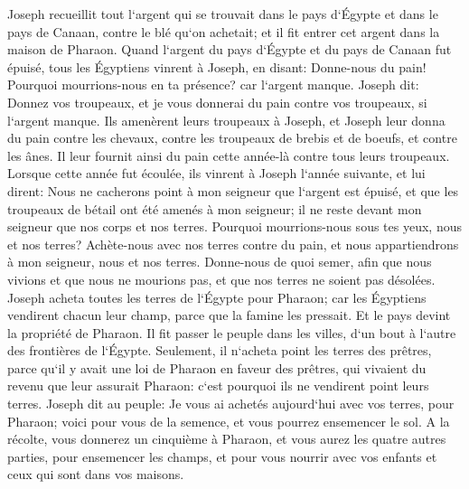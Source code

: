 \verse Joseph recueillit tout l`argent qui se trouvait dans le pays d`Égypte et dans le pays de Canaan, contre le blé qu`on achetait; et il fit entrer cet argent dans la maison de Pharaon. 
\verse Quand l`argent du pays d`Égypte et du pays de Canaan fut épuisé, tous les Égyptiens vinrent à Joseph, en disant: Donne-nous du pain! Pourquoi mourrions-nous en ta présence? car l`argent manque. 
\verse Joseph dit: Donnez vos troupeaux, et je vous donnerai du pain contre vos troupeaux, si l`argent manque. 
\verse Ils amenèrent leurs troupeaux à Joseph, et Joseph leur donna du pain contre les chevaux, contre les troupeaux de brebis et de boeufs, et contre les ânes. Il leur fournit ainsi du pain cette année-là contre tous leurs troupeaux. 
\verse Lorsque cette année fut écoulée, ils vinrent à Joseph l`année suivante, et lui dirent: Nous ne cacherons point à mon seigneur que l`argent est épuisé, et que les troupeaux de bétail ont été amenés à mon seigneur; il ne reste devant mon seigneur que nos corps et nos terres. 
\verse Pourquoi mourrions-nous sous tes yeux, nous et nos terres? Achète-nous avec nos terres contre du pain, et nous appartiendrons à mon seigneur, nous et nos terres. Donne-nous de quoi semer, afin que nous vivions et que nous ne mourions pas, et que nos terres ne soient pas désolées. 
\verse Joseph acheta toutes les terres de l`Égypte pour Pharaon; car les Égyptiens vendirent chacun leur champ, parce que la famine les pressait. Et le pays devint la propriété de Pharaon. 
\verse Il fit passer le peuple dans les villes, d`un bout à l`autre des frontières de l`Égypte. 
\verse Seulement, il n`acheta point les terres des prêtres, parce qu`il y avait une loi de Pharaon en faveur des prêtres, qui vivaient du revenu que leur assurait Pharaon: c`est pourquoi ils ne vendirent point leurs terres. 
\verse Joseph dit au peuple: Je vous ai achetés aujourd`hui avec vos terres, pour Pharaon; voici pour vous de la semence, et vous pourrez ensemencer le sol. 
\verse A la récolte, vous donnerez un cinquième à Pharaon, et vous aurez les quatre autres parties, pour ensemencer les champs, et pour vous nourrir avec vos enfants et ceux qui sont dans vos maisons. 
